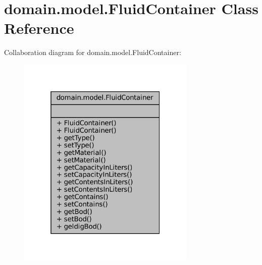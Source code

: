 \hypertarget{classdomain_1_1model_1_1FluidContainer}{}\section{domain.\+model.\+Fluid\+Container Class Reference}
\label{classdomain_1_1model_1_1FluidContainer}


Collaboration diagram for domain.\+model.\+Fluid\+Container\+:
\nopagebreak
\begin{figure}[H]
\begin{center}
\leavevmode
\includegraphics[width=241pt]{classdomain_1_1model_1_1FluidContainer__coll__graph}
\end{center}
\end{figure}
